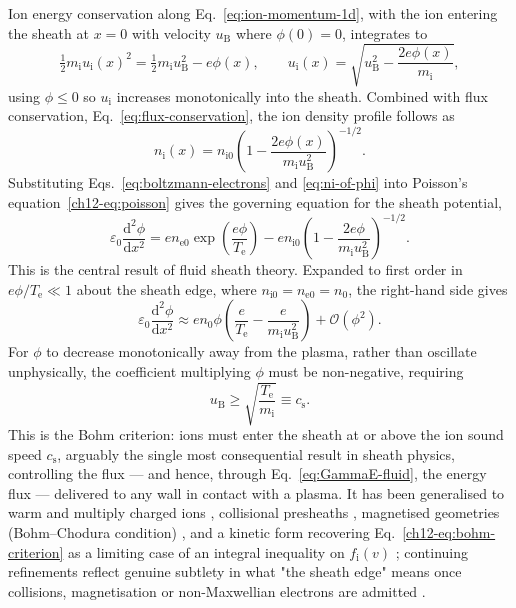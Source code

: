 Ion energy conservation along Eq.~\eqref{eq:ion-momentum-1d}, with the ion entering the sheath at $x=0$ with velocity $u_{\mathrm{B}}$ where $\phi(0)=0$, integrates to
\begin{equation}
\tfrac{1}{2}m_{\mathrm{i}}u_{\mathrm{i}}(x)^2 = \tfrac{1}{2}m_{\mathrm{i}}u_{\mathrm{B}}^2 - e\phi(x), \qquad
u_{\mathrm{i}}(x) = \sqrt{u_{\mathrm{B}}^2 - \frac{2e\phi(x)}{m_{\mathrm{i}}}},
\label{eq:ion-energy-cons}
\end{equation}
using $\phi\le0$ so $u_{\mathrm{i}}$ increases monotonically into the sheath. Combined with flux conservation, Eq.~\eqref{eq:flux-conservation}, the ion density profile follows as
\begin{equation}
n_{\mathrm{i}}(x) = n_{\mathrm{i}0}\left(1 - \frac{2e\phi(x)}{m_{\mathrm{i}}u_{\mathrm{B}}^2}\right)^{-1/2}.
\label{eq:ni-of-phi}
\end{equation}
Substituting Eqs.~\eqref{eq:boltzmann-electrons} and \eqref{eq:ni-of-phi} into Poisson's equation~\eqref{ch12-eq:poisson} gives the governing equation for the sheath potential,
\begin{equation}
\varepsilon_0\frac{\mathrm{d}^2\phi}{\mathrm{d}x^2} = e n_{\mathrm{e}0}\exp\!\left(\frac{e\phi}{T_{\mathrm{e}}}\right) - e n_{\mathrm{i}0}\left(1 - \frac{2e\phi}{m_{\mathrm{i}}u_{\mathrm{B}}^2}\right)^{-1/2}.
\label{eq:sheath-ode}
\end{equation}
This is the central result of fluid sheath theory. Expanded to first order in $e\phi/T_{\mathrm{e}}\ll1$ about the sheath edge, where $n_{\mathrm{i}0}=n_{\mathrm{e}0}=n_0$, the right-hand side gives
\begin{equation}
\varepsilon_0\frac{\mathrm{d}^2\phi}{\mathrm{d}x^2} \approx e n_0\phi\left(\frac{e}{T_{\mathrm{e}}} - \frac{e}{m_{\mathrm{i}}u_{\mathrm{B}}^2}\right) + \mathcal{O}(\phi^2).
\label{eq:sheath-linearised}
\end{equation}
For $\phi$ to decrease monotonically away from the plasma, rather than oscillate unphysically, the coefficient multiplying $\phi$ must be non-negative, requiring
\begin{equation}
u_{\mathrm{B}} \ge \sqrt{\frac{T_{\mathrm{e}}}{m_{\mathrm{i}}}} \equiv c_{\mathrm{s}}.
\label{ch12-eq:bohm-criterion}
\end{equation}
This is the Bohm criterion: ions must enter the sheath at or above the ion sound speed $c_{\mathrm{s}}$, arguably the single most consequential result in sheath physics, controlling the flux — and hence, through Eq.~\eqref{eq:GammaE-fluid}, the energy flux — delivered to any wall in contact with a plasma. It has been generalised to warm and multiply charged ions \cite{ref0004}, collisional presheaths \cite{ref0009,ref0024}, magnetised geometries (Bohm--Chodura condition) \cite{ref0017,ref0018}, and a kinetic form recovering Eq.~\eqref{ch12-eq:bohm-criterion} as a limiting case of an integral inequality on $f_{\mathrm{i}}(v)$ \cite{ref0090}; continuing refinements reflect genuine subtlety in what "the sheath edge" means once collisions, magnetisation or non-Maxwellian electrons are admitted \cite{ref0015}.

